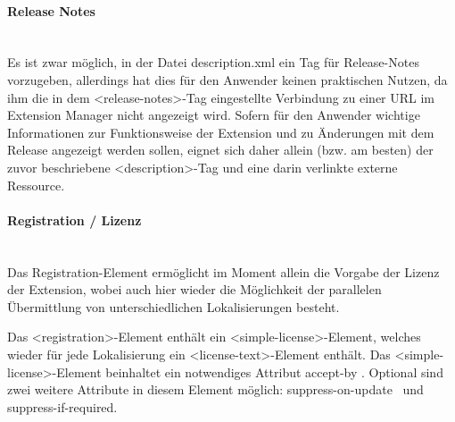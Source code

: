 \documentclass[12pt,a4paper,titlepage]{book}
\begin{document}
\paragraph*{Release Notes}$~~$\\

Es ist zwar möglich, in der Datei description.xml ein Tag für Release-Notes vorzugeben, allerdings hat dies für den Anwender keinen praktischen Nutzen, da ihm die in dem <release-notes>-Tag eingestellte Verbindung zu einer URL im Extension Manager nicht angezeigt wird. Sofern für den Anwender wichtige Informationen zur Funktionsweise der Extension und zu Änderungen mit dem Release angezeigt werden sollen, eignet sich daher allein (bzw. am besten) der zuvor beschriebene <description>-Tag und eine darin verlinkte externe Ressource.

\paragraph*{Registration / Lizenz}$~~$\\

Das Registration-Element ermöglicht im Moment allein die Vorgabe der Lizenz der Extension, wobei auch hier wieder die Möglichkeit der parallelen Übermittlung von unterschiedlichen Lokalisierungen besteht.

Das <registration>-Element enthält ein <simple-license>-Element, welches wieder für jede Lokalisierung ein <license-text>-Element enthält. Das <simple-license>-Element beinhaltet ein notwendiges Attribut \glqq accept-by \grqq . Optional sind zwei weitere Attribute in diesem Element möglich: \glqq suppress-on-update\grqq~ und \glqq suppress-if-required\grqq .\\
\end{document}
